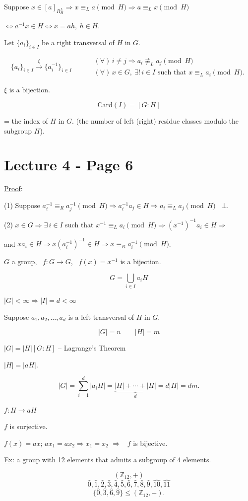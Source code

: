 \bigskip
\noindent Suppose $x\in[a]_{R_H^L} \Rightarrow x\equiv_L a \pmod H \Rightarrow a\equiv_L x \pmod H$

\noindent $\Leftrightarrow a^{-1}x\in H \Leftrightarrow x=ah,\ h\in H$.

\bigskip
\noindent Let $\{a_i\}_{i\in I}$ be a right transversal of $H$ in $G$.

\[
\{a_i\}_{i\in I} \xrightarrow{\ \xi\ } \{a_i^{-1}\}_{i\in I} \qquad
\begin{aligned}
&(\forall)\, i\neq j \Rightarrow a_i \not\equiv_L a_j \pmod H\\
&(\forall)\, x\in G,\ \exists!\, i\in I \text{ such that } x\equiv_L a_i \pmod H.
\end{aligned}
\]

\noindent $\xi$ is a bijection.

\[
\text{Card}(I) = [G:H]
\]

\noindent = the index of $H$ in $G$. (the number of left (right) residue classes modulo the subgroup $H$).



\section*{Lecture 4 - Page 6}

\noindent\underline{Proof}:

\bigskip
\noindent (1) Suppose $a_i^{-1}\equiv_R a_j^{-1} \pmod H \Rightarrow a_i^{-1}a_j\in H \Rightarrow a_i\equiv_L a_j \pmod H$ \ $\bot$.

\bigskip
\noindent (2) $x\in G \Rightarrow \exists\, i\in I$ such that $x^{-1}\equiv_L a_i \pmod H \Rightarrow (x^{-1})^{-1}a_i\in H \Rightarrow$

\noindent and $xa_i\in H \Rightarrow x(a_i^{-1})^{-1}\in H \Rightarrow x\equiv_R a_i^{-1} \pmod H$.

\bigskip
\noindent $G$ a group, \ $f:G\to G$, \ $f(x)=x^{-1}$ is a bijection.

\bigskip
\noindent
\[
G = \bigcup_{i\in I} a_iH
\]

\noindent $|G|<\infty \Rightarrow |I|=d<\infty$

\medskip
\noindent Suppose $a_1,a_2,\ldots,a_d$ is a left transversal of $H$ in $G$.

\[
|G|=n \qquad |H|=m
\]

\noindent $|G| = |H|[G:H]$ -- Lagrange's Theorem

\noindent $|H|=|aH|$.

\[
|G| = \sum_{i=1}^{d} |a_iH| = \underbrace{|H|+\cdots+|H|}_{d} = d|H| = dm.
\]

\noindent $f : H \to aH$

\noindent $f$ is surjective.

\noindent $f(x)=ax$; \quad $ax_1=ax_2 \Rightarrow x_1=x_2$ \quad $\Rightarrow$ \ $f$ is bijective.

\bigskip
\noindent\underline{Ex}: a group with 12 elements that admits a subgroup of 4 elements.

\[
(\mathbb{Z}_{12},+)
\]
\[
\hat 0,\hat 1,\hat 2,\hat 3,\hat 4,\hat 5,\hat 6,\hat 7,\hat 8,\hat 9,\hat{10},\hat{11}
\]
\[
\{\hat 0,\hat 3,\hat 6,\hat 9\} \leq (\mathbb{Z}_{12},+).
\]


